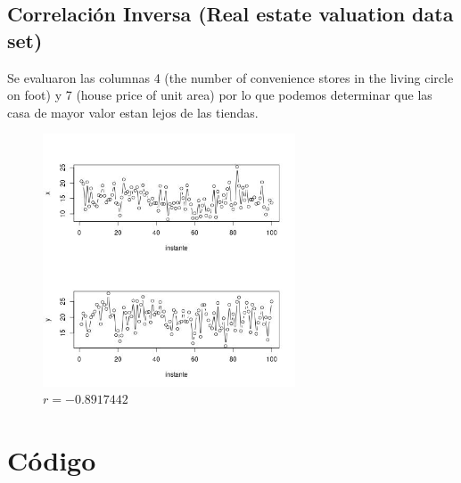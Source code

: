 \documentclass[12pt]{article}
\begin{document}
\subsection*{Correlación Inversa (Real estate valuation data set)}
\label{sec:orgfebecb6}
Se evaluaron las columnas 4 (the number of convenience stores in the living
 circle on foot) y 7 (house price of unit area) por lo que podemos determinar 
que las casa de mayor valor estan lejos de las tiendas.

\begin{figure}[htbp]
\centering
\includegraphics[width=7.5cm]{img/corelacion_inversa.jpeg}
\caption{\(r=-0.8917442\)}
\end{figure}

\section*{Código}
\label{sec:org07241bb}

\end{document}
